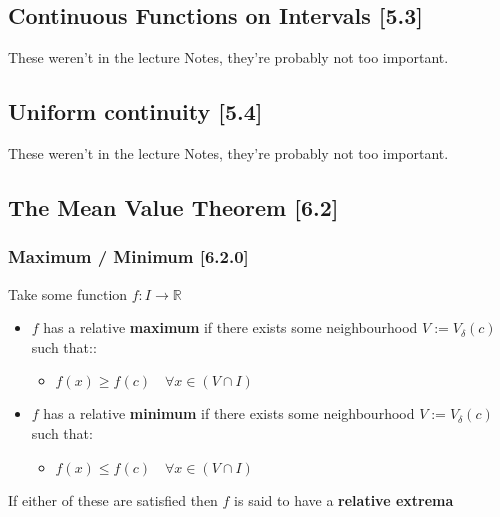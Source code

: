 \documentclass[
]{article}
\begin{document}
\hypertarget{header-n3979}{%
\subsection{Continuous Functions on Intervals
{[}5.3{]}}\label{header-n3979}}

These weren't in the lecture Notes, they're probably not too important.

\hypertarget{header-n3981}{%
\subsection{Uniform continuity {[}5.4{]}}\label{header-n3981}}

These weren't in the lecture Notes, they're probably not too important.

\hypertarget{header-n3984}{%
\subsection{The Mean Value Theorem {[}6.2{]}}\label{header-n3984}}

\hypertarget{header-n3985}{%
\subsubsection{Maximum / Minimum {[}6.2.0{]}}\label{header-n3985}}

Take some function \(f: I \rightarrow \mathbb{R}\)

\begin{itemize}
\item
  \(f\) has a relative \textbf{maximum} if there exists some
  neighbourhood \(V:=V_{\delta}\left( c \right)\) such that::

  \begin{itemize}
  \item
    \(f(x) \geq f(c) \quad \forall x \in \left( V\cap I \right)\)
  \end{itemize}
\item
  \(f\) has a relative \textbf{minimum} if there exists some
  neighbourhood \(V:=V_{\delta}\left( c \right)\) such that:

  \begin{itemize}
  \item
    \(f(x) \leq f(c) \quad \forall x \in \left( V\cap I \right)\)
  \end{itemize}
\end{itemize}

If either of these are satisfied then \(f\) is said to have a
\textbf{relative extrema}
\end{document}
